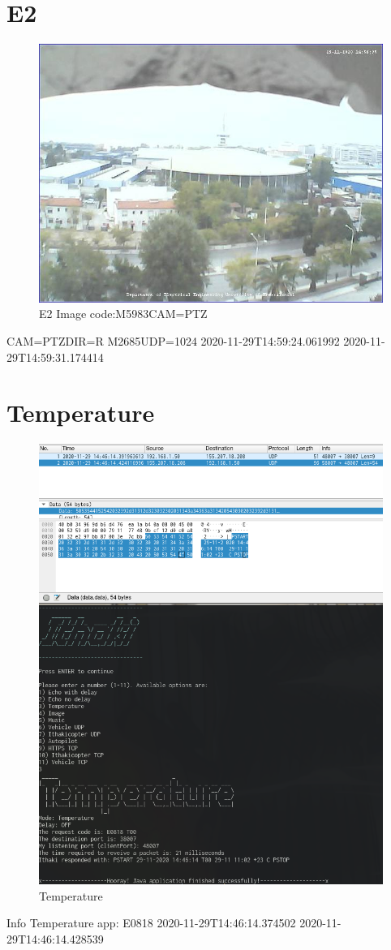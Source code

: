 \documentclass[hidelinks, 12pt, a4paper]{article}
\begin{document}
\section{E2}

\begin{figure}[h!]
\centering
	\includegraphics[height=.38\textheight, width=\textwidth]{assets/session2/image_ptz.jpg}
	\caption{E2 Image code:M5983CAM=PTZ} 
\end{figure}
CAM=PTZDIR=R
M2685UDP=1024
2020-11-29T14:59:24.061992
2020-11-29T14:59:31.174414


\section{Temperature}

\begin{figure}[h!]
\centering
	\includegraphics[height=.38\textheight, width=.8\textwidth]{assets/session2/temp.png}
	\caption{Temperature} 
\end{figure}
Info Temperature app:
E0818 
2020-11-29T14:46:14.374502
2020-11-29T14:46:14.428539
\end{document}
